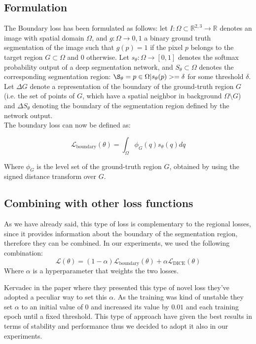 \subsection{Formulation}
The Boundary loss has been formulated as follows: let $I: \Omega \subset
\mathbb{R}^{2,3} \rightarrow \mathbb{R}$ denotes an image with spatial domain
$\Omega$, and $g: \Omega \rightarrow {0,1}$ a binary ground truth segmentation
of the image such that $g(p) = 1$ if the pixel $p$ belongs to the target region
$G \subset \Omega$ and $0$ otherwise. Let $s_\theta : \Omega \rightarrow [0,1]$
denotes the softmax probability output of a deep segmentation network, and
$S_\theta \subset \Omega$ denotes the corresponding segmentation region:
$\S_\theta = {p \in \Omega | s_\theta(p) >= \delta}$ for some threshold
$\delta$. Let $\Delta G$ denote a representation of the boundary of the
ground-truth region $G$ (i.e. the set of points of $G$, which have a spatial
neighbor in background $\Omega \setminus G$) and $\Delta S_\theta$ denoting the
boundary of the segmentation region defined by the network output.\\
The boundary loss can now be defined as:

\begin{equation}
  \label{eq:boundaryloss}
  \mathcal{L}_{\text{boundary}}(\theta) = \int_{\Omega} \phi_G(q)s_\theta(q)dq
\end{equation}

Where $\phi_G$ is the level set of the ground-truth region $G$, obtained by
using the signed distance transform over $G$.

\subsection{Combining with other loss functions}
As we have already said, this type of loss is complementary to the regional
losses, since it provides information about the boundary of the segmentation
region, therefore they can be combined. In our experiments, we used the
following combination:
\begin{equation}
  \label{eq:final}
  \mathcal{L}(\theta) = (1-\alpha)\mathcal{L}_{\text{boundary}}(\theta) +
  \alpha\mathcal{L}_{\text{DICE}}(\theta)
\end{equation}
Where $\alpha$ is a hyperparameter that weights the two losses.

Kervadec \etal \cite{kervadec2019boundary} in the paper where they presented
this type of novel loss they've adopted a peculiar way to set this $\alpha$. As
the training was kind of unstable they set $\alpha$ to an initial value of $0$
and increased its value by $0.01$ and each training epoch until a fixed
threshold. This type of approach have given the best results in terms of
stability and performance thus we decided to adopt it also in our experiments.

